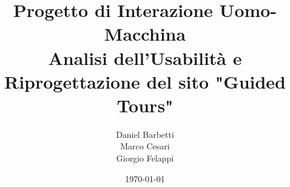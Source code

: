 \documentclass[a4paper,12pt]{report}
\title{Progetto di Interazione Uomo-Macchina\\ \large Analisi dell'Usabilità e Riprogettazione del sito "Guided Tours"}
\author{Daniel Barbetti\\Marco Cesari\\Giorgio Felappi}
\date{\today}
\begin{document}
\maketitle
\thispagestyle{empty}

\renewcommand{\contentsname}{Indice}
\tableofcontents









\end{document}
